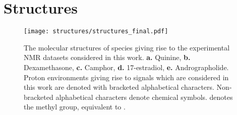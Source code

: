 \section{Structures}

\begin{figure}[h!]
    \centering
    \texttt{[image: structures/structures\_final.pdf]}
    \caption[
        The molecular structures of species giving rise to the experimental
        \acs{NMR} datasets considered in this work.
    ]{
        The molecular structures of species giving rise to the experimental
        \acs{NMR} datasets considered in this work.
        \textbf{a.} Quinine,
        \textbf{b.} Dexamethasone,
        \textbf{c.} Camphor,
        \textbf{d.} 17\textbeta-estradiol,
        \textbf{e.} Andrographolide.
        Proton environments giving rise to signals which are considered in this
        work are denoted with bracketed alphabetical characters. Non-bracketed
        alphabetical characters denote chemical symbols.  denotes the methyl
        group, equivalent to .
    }
    \label{fig:structures}
\end{figure}

